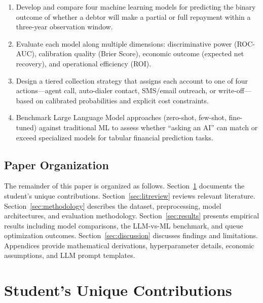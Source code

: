 \documentclass[12pt, a4paper]{article}
\begin{document}
\begin{enumerate}[label=(O\arabic*)]
    \item Develop and compare four machine learning models for predicting the binary outcome of whether a debtor will make a partial or full repayment within a three-year observation window.
    
    \item Evaluate each model along multiple dimensions: discriminative power (ROC-AUC), calibration quality (Brier Score), economic outcome (expected net recovery), and operational efficiency (ROI).
    
    \item Design a tiered collection strategy that assigns each account to one of four actions---agent call, auto-dialer contact, SMS/email outreach, or write-off---based on calibrated probabilities and explicit cost constraints.
    
    \item Benchmark Large Language Model approaches (zero-shot, few-shot, fine-tuned) against traditional ML to assess whether ``asking an AI'' can match or exceed specialized models for tabular financial prediction tasks.
\end{enumerate}

\subsection{Paper Organization}

The remainder of this paper is organized as follows. Section~\ref{sec:contribution} documents the student's unique contributions. Section~\ref{sec:litreview} reviews relevant literature. Section~\ref{sec:methodology} describes the dataset, preprocessing, model architectures, and evaluation methodology. Section~\ref{sec:results} presents empirical results including model comparisons, the LLM-vs-ML benchmark, and queue optimization outcomes. Section~\ref{sec:discussion} discusses findings and limitations. Appendices provide mathematical derivations, hyperparameter details, economic assumptions, and LLM prompt templates.


\section{Student's Unique Contributions}\label{sec:contribution}
\end{document}
